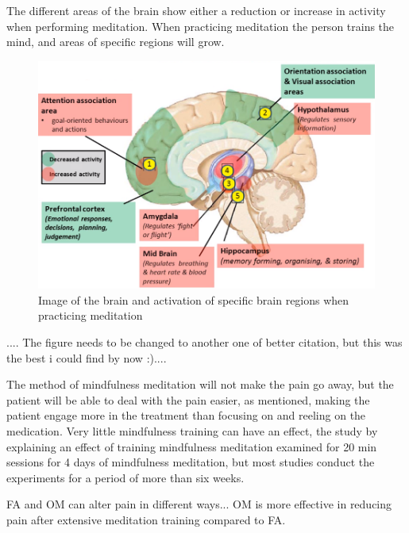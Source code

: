 The different areas of the brain show either a reduction or increase in activity when performing meditation. When practicing meditation the person trains the mind, and areas of specific regions will grow. \cite{Zeidan2012} 

\begin{figure}[H]
	\includegraphics[width=.8\textwidth]{figures/brain_meditation} 
	\caption{Image of the brain and activation of specific brain regions when practicing meditation}
	\label{fig:brain_meditation}  
\end{figure}   
.... The figure needs to be changed to another one of better citation, but this was the best i could find by now :)....

The method of mindfulness meditation will not make the pain go away, but the patient will be able to deal with the pain easier, as mentioned, making the patient engage more in the treatment than focusing on and reeling on the medication. \cite{Jacob2016}
Very little mindfulness training can have an effect, the study by \cite{Zeidan2012} explaining an effect of training mindfulness meditation examined for 20 min sessions for 4 days of mindfulness meditation, but most studies conduct the experiments for a period of more than six weeks.  \cite{Zeidan2012}

FA and OM can alter pain in different ways...
OM is more effective in reducing pain after extensive meditation training compared to FA. 
\cite{Varilly2012}
                                      


